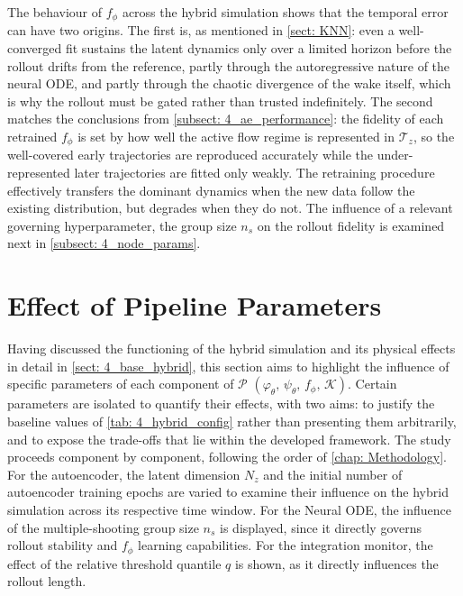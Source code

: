 The behaviour of $f_\phi$ across the hybrid simulation shows that the temporal error can have two origins. The first is, as mentioned in \autoref{sect: KNN}: even a well-converged fit sustains the latent dynamics only over a limited horizon before the rollout drifts from the reference, partly through the autoregressive nature of the neural ODE, and partly through the chaotic divergence of the wake itself, which is why the rollout must be gated rather than trusted indefinitely. The second matches the conclusions from \autoref{subsect: 4_ae_performance}: the fidelity of each retrained $f_\phi$ is set by how well the active flow regime is represented in $\boldsymbol{\mathcal{T}}_z$, so the well-covered early trajectories are reproduced accurately while the under-represented later trajectories are fitted only weakly. The retraining procedure effectively transfers the dominant dynamics when the new data follow the existing distribution, but degrades when they do not. The influence of a relevant governing hyperparameter, the group size $n_s$ on the rollout fidelity is examined next in \autoref{subsect: 4_node_params}.

\section{Effect of Pipeline Parameters}
\label{sect: 4_p_parameters}

Having discussed the functioning of the hybrid simulation and its physical effects in detail in \autoref{sect: 4_base_hybrid}, this section aims to highlight the influence of specific parameters of each component of $\mathcal{P}$  $(\varphi_\theta,\,\psi_\theta,\,f_\phi,\,\mathcal{K})$. Certain parameters are isolated to quantify their effects, with two aims: to justify the baseline values of \autoref{tab: 4_hybrid_config} rather than presenting them arbitrarily, and to expose the trade-offs that lie within the developed framework. The study proceeds component by component, following the order of \autoref{chap: Methodology}. For the autoencoder, the latent dimension $N_z$ and the initial number of autoencoder training epochs are varied to examine their influence on the hybrid simulation across its respective time window. For the Neural ODE, the influence of the multiple-shooting group size $n_s$ is displayed, since it directly governs rollout stability and $f_\phi$ learning capabilities. For the integration monitor, the effect of the relative threshold quantile $q$ is shown, as it directly influences the rollout length. 

